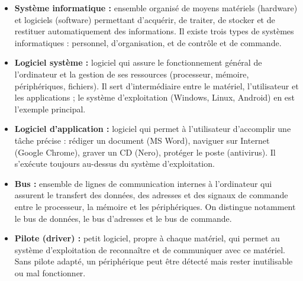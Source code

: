 \documentclass[11pt]{article}
\begin{document}
\begin{corrige}
\begin{itemize}
\item \textbf{Système informatique :} ensemble organisé de moyens matériels (hardware) et logiciels (software) permettant d'acquérir, de traiter, de stocker et de restituer automatiquement des informations. Il existe trois types de systèmes informatiques : personnel, d'organisation, et de contrôle et de commande.
\item \textbf{Logiciel système :} logiciel qui assure le fonctionnement général de l'ordinateur et la gestion de ses ressources (processeur, mémoire, périphériques, fichiers). Il sert d'intermédiaire entre le matériel, l'utilisateur et les applications ; le système d'exploitation (Windows, Linux, Android) en est l'exemple principal.
\item \textbf{Logiciel d'application :} logiciel qui permet à l'utilisateur d'accomplir une tâche précise : rédiger un document (MS Word), naviguer sur Internet (Google Chrome), graver un CD (Nero), protéger le poste (antivirus). Il s'exécute toujours au-dessus du système d'exploitation.
\item \textbf{Bus :} ensemble de lignes de communication internes à l'ordinateur qui assurent le transfert des données, des adresses et des signaux de commande entre le processeur, la mémoire et les périphériques. On distingue notamment le bus de données, le bus d'adresses et le bus de commande.
\item \textbf{Pilote (driver) :} petit logiciel, propre à chaque matériel, qui permet au système d'exploitation de reconnaître et de communiquer avec ce matériel. Sans pilote adapté, un périphérique peut être détecté mais rester inutilisable ou mal fonctionner.
\end{itemize}
\end{corrige}
\end{document}
